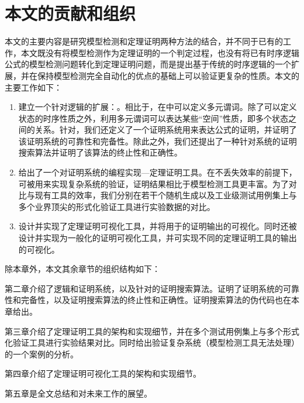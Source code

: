 \section{本文的贡献和组织}
本文的主要内容是研究模型检测和定理证明两种方法的结合，并不同于已有的工作，本文既没有将模型检测作为定理证明的一个判定过程，也没有将已有时序逻辑公式的模型检测问题转化到定理证明问题，而是提出基于传统的时序逻辑的一个扩展，并在保持模型检测完全自动化的优点的基础上可以验证更复杂的性质。本文的主要工作如下：
\begin{enumerate}
	\item 建立一个针对\CTL{}逻辑的扩展：\CTLP{}。相比于\CTL{}，在\CTLP{}中可以定义多元谓词。除了可以定义状态的时序性质之外，利用多元谓词可以表达某些“空间”性质，即多个状态之间的关系。针对\CTLP{}，我们还定义了一个证明系统\SCTL{}用来表达\CTLP{}公式的证明，并证明了该证明系统的可靠性和完备性。除此之外，我们还提出了一种针对\SCTL{}系统的证明搜索算法并证明了该算法的终止性和正确性。
	\item 给出了一个对证明系统\SCTL{}的编程实现---定理证明工具\sctlprov{}。在不丢失效率的前提下，\sctlprov{}可被用来实现复杂系统的验证，证明结果相比于模型检测工具更丰富。为了对比\sctlprov{}与现有工具的效率，我们分别在若干个随机生成以及工业级测试用例集上与多个业界顶尖的形式化验证工具进行实验数据的对比。
	\item 设计并实现了定理证明可视化工具，并将用于\sctlprov{}的证明输出的可视化。同时还被设计并实现为一般化的证明可视化工具，并可实现不同的定理证明工具的输出的可视化。
\end{enumerate}

除本章外，本文其余章节的组织结构如下：

第二章介绍了\CTLP{}逻辑和证明系统\SCTL{}，以及针对\SCTL{}的证明搜索算法。证明了\SCTL{}证明系统的可靠性和完备性，以及证明搜索算法的终止性和正确性。证明搜索算法的伪代码也在本章给出。

第三章介绍了定理证明工具\sctlprov{}的架构和实现细节，并在多个测试用例集上与多个形式化验证工具进行实验结果对比。同时给出\sctlprov{}验证复杂系统（模型检测工具无法处理）的一个案例的分析。

第四章介绍了定理证明可视化工具的架构和实现细节。

第五章是全文总结和对未来工作的展望。